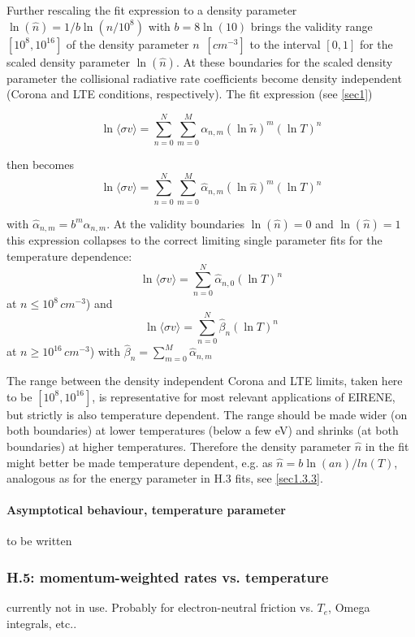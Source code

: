 \documentclass[12pt,dvipdfmx]{article}
\begin{document}
Further rescaling the fit expression to a density parameter
$\ln(\hat n) = 1/b \ln(n/10^8)$ with $b = 8 \ln(10)$ brings the validity range $[10^8 ,10^{16}]$ of the density parameter $n$ $\, [cm^{-3}]$  to the
interval $[0, 1]$ for the scaled density parameter $\ln(\hat n)$.
At these boundaries for the scaled density parameter the collisional radiative rate coefficients
become density independent (Corona and LTE conditions, respectively).
The fit expression (see \ref{sec1})

$$\ln \langle\sigma v\rangle = \sum_{n=0}^N\sum_{m=0}^M \alpha_{n,m}(\ln \tilde{n})^m(\ln T)^n $$

then becomes
$$\ln \langle\sigma v\rangle = \sum_{n=0}^N\sum_{m=0}^M \hat\alpha_{n,m}(\ln \hat{n})^m(\ln T)^n $$

with $ \hat\alpha_{n,m} = b^m \alpha_{n,m}$.
At the validity boundaries $\ln(\hat n) =0$  and $\ln(\hat n)  =1$
this expression collapses to the correct limiting single parameter fits for the temperature dependence:
$$\ln \langle\sigma v\rangle = \sum_{n=0}^N\hat\alpha_{n,0}(\ln T)^n $$ at $ n\leq 10^8 \,  cm^{-3}$)
and
$$\ln \langle\sigma v\rangle = \sum_{n=0}^N\hat\beta_{n}(\ln T)^n $$ at $ n \geq 10^{16} \,  cm^{-3}$)
with $\hat\beta_{n} = \sum_{m=0}^M \hat\alpha_{n,m}$

The range between the density independent Corona and LTE limits, taken here to be
$[10^8 ,10^{16}]$,  is representative for most relevant applications of EIRENE, but strictly is also temperature dependent.
The range should be made wider (on both boundaries) at lower temperatures (below a few eV)  and shrinks
(at both boundaries) at higher temperatures. Therefore the density parameter $\hat n$ in the fit might better be made
temperature dependent, e.g. as $\hat n = b \ln(a n)/ln(T)$, analogous as for the energy parameter in H.3 fits, see \ref{sec1.3.3}.

\paragraph{Asymptotical behaviour, temperature parameter}
to be written

\subsubsection{H.5: momentum-weighted rates vs. temperature}\label{sec1.3.5}
currently not in use. Probably for electron-neutral friction vs. $T_e$, Omega integrals, etc..
\end{document}
